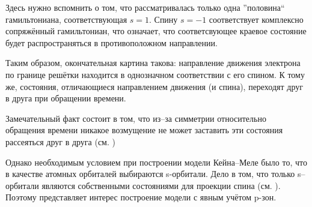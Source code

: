 	Здесь нужно вспомнить о том, что рассматривалась только одна ''половина`` гамильтониана,
	соответствующая $s = 1$. Спину $s = -1$ соответствует комплексно сопряжённый
	гамильтониан, что означает, что соответсвующее краевое состояние будет распространяться
	в противоположном направлении.
	
	Таким образом, окончательная картина такова: направление движения электрона по границе
	решётки находится в однозначном соответствии с его спином. К тому же, состояния,
	отличающиеся направлением движения (и спина), переходят друг в друга при обращении
	времени.

	Замечательный факт состоит в том, что из--за симметрии относительно обращения времени
	никакое возмущение не может заставить эти состояния рассеяться друг в друга (см.
	\cite{Kane2005})

	Однако необходимым условием при построении модели Кейна--Меле было то, что в качестве
	атомных орбиталей выбираются s-орбитали. Дело в том, что только s--орбитали являются 
	собственными состояниями для проекции спина (см. \cite{LL_KED}). 
	Поэтому представляет интерес построение
	модели с явным учётом p-зон.
